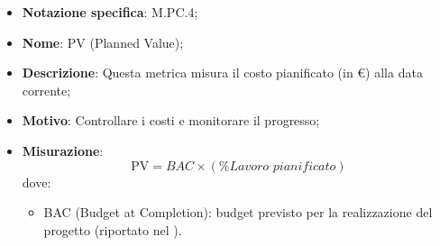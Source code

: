 \begin{itemize}
    \item \textbf{Notazione specifica}: M.PC.4;
    \item \textbf{Nome}: PV (Planned Value);
    \item \textbf{Descrizione}: Questa metrica misura il costo pianificato (in €) alla data corrente;
    \item \textbf{Motivo}: Controllare i costi e monitorare il progresso;
    \item \textbf{Misurazione}:
    \[
        \text{PV} = \textit{BAC} \times (\% {\textit{Lavoro pianificato}})
    \]
    dove:
    \begin{itemize}
        \item BAC (Budget at Completion): budget previsto per la realizzazione del progetto (riportato nel \PianoDiProgetto).
    \end{itemize}
\end{itemize}
